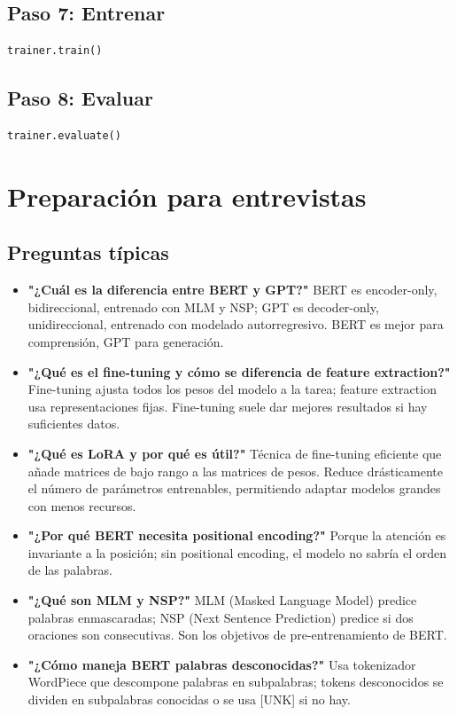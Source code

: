\documentclass[12pt,a4paper,openany,oneside]{book}
\begin{document}
\subsection{Paso 7: Entrenar}
\begin{lstlisting}[language=Python]
trainer.train()
\end{lstlisting}

\subsection{Paso 8: Evaluar}
\begin{lstlisting}[language=Python]
trainer.evaluate()
\end{lstlisting}

\section{Preparación para entrevistas}

\subsection{Preguntas típicas}
\begin{itemize}
    \item \textbf{"¿Cuál es la diferencia entre BERT y GPT?"}
    BERT es encoder-only, bidireccional, entrenado con MLM y NSP; GPT es decoder-only, unidireccional, entrenado con modelado autorregresivo. BERT es mejor para comprensión, GPT para generación.
    
    \item \textbf{"¿Qué es el fine-tuning y cómo se diferencia de feature extraction?"}
    Fine-tuning ajusta todos los pesos del modelo a la tarea; feature extraction usa representaciones fijas. Fine-tuning suele dar mejores resultados si hay suficientes datos.
    
    \item \textbf{"¿Qué es LoRA y por qué es útil?"}
    Técnica de fine-tuning eficiente que añade matrices de bajo rango a las matrices de pesos. Reduce drásticamente el número de parámetros entrenables, permitiendo adaptar modelos grandes con menos recursos.
    
    \item \textbf{"¿Por qué BERT necesita positional encoding?"}
    Porque la atención es invariante a la posición; sin positional encoding, el modelo no sabría el orden de las palabras.
    
    \item \textbf{"¿Qué son MLM y NSP?"}
    MLM (Masked Language Model) predice palabras enmascaradas; NSP (Next Sentence Prediction) predice si dos oraciones son consecutivas. Son los objetivos de pre-entrenamiento de BERT.
    
    \item \textbf{"¿Cómo maneja BERT palabras desconocidas?"}
    Usa tokenizador WordPiece que descompone palabras en subpalabras; tokens desconocidos se dividen en subpalabras conocidas o se usa [UNK] si no hay.
\end{itemize}
\end{document}
